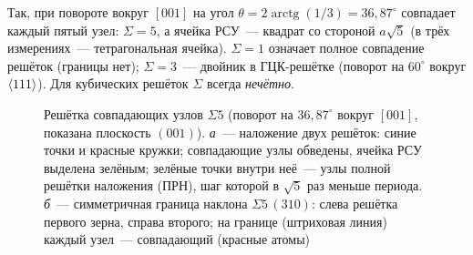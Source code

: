 Так, при повороте вокруг $[001]$ на угол
$\theta=2\operatorname{arctg}(1/3)=36{,}87^\circ$
совпадает каждый пятый узел: $\Sigma=5$, а ячейка РСУ~— квадрат со
стороной $a\sqrt5$ (в трёх измерениях~— тетрагональная ячейка).
$\Sigma=1$ означает полное совпадение решёток (границы нет); $\Sigma=3$~—
двойник в ГЦК-решётке (поворот на $60^\circ$ вокруг $\langle 111\rangle$). Для
кубических решёток $\Sigma$ всегда \emph{нечётно}.

\begin{figure}[ht]
\centering
{}
\caption{Решётка совпадающих узлов $\Sigma5$ (поворот на $36{,}87^\circ$
вокруг $[001]$, показана плоскость $(001)$). \textit{а}~— наложение двух
решёток: синие точки и красные кружки; совпадающие узлы обведены, ячейка
РСУ выделена зелёным; зелёные точки внутри неё~— узлы полной решётки
наложения (ПРН), шаг которой в $\sqrt5$ раз меньше периода. \textit{б}~—
симметричная граница наклона $\Sigma5\,(310)$: слева решётка первого
зерна, справа второго; на границе (штриховая линия) каждый узел~—
совпадающий (красные атомы)}
\label{fig:csl5}
\end{figure}


